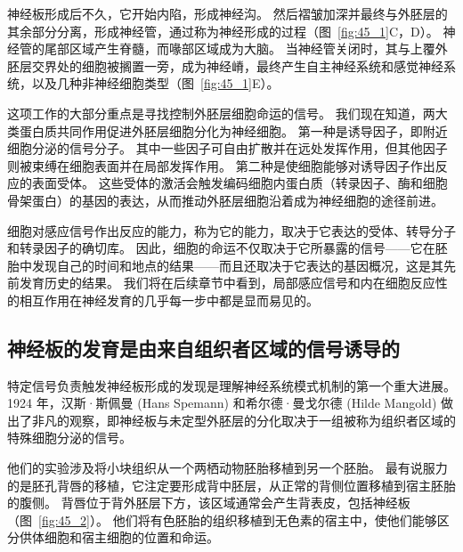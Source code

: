 神经板形成后不久，它开始内陷，形成神经沟。
然后褶皱加深并最终与外胚层的其余部分分离，形成神经管，通过称为神经形成的过程（图~\ref{fig:45_1}C，D）。
神经管的尾部区域产生脊髓，而喙部区域成为大脑。
当神经管关闭时，其与上覆外胚层交界处的细胞被搁置一旁，成为神经嵴，最终产生自主神经系统和感觉神经系统，以及几种非神经细胞类型（图~\ref{fig:45_1}E）。


这项工作的大部分重点是寻找控制外胚层细胞命运的信号。
我们现在知道，两大类蛋白质共同作用促进外胚层细胞分化为神经细胞。
第一种是诱导因子，即附近细胞分泌的信号分子。
其中一些因子可自由扩散并在远处发挥作用，但其他因子则被束缚在细胞表面并在局部发挥作用。
第二种是使细胞能够对诱导因子作出反应的表面受体。
这些受体的激活会触发编码细胞内蛋白质（转录因子、酶和细胞骨架蛋白）的基因的表达，从而推动外胚层细胞沿着成为神经细胞的途径前进。


细胞对感应信号作出反应的能力，称为它的能力，取决于它表达的受体、转导分子和转录因子的确切库。
因此，细胞的命运不仅取决于它所暴露的信号——它在胚胎中发现自己的时间和地点的结果——而且还取决于它表达的基因概况，这是其先前发育历史的结果。
我们将在后续章节中看到，局部感应信号和内在细胞反应性的相互作用在神经发育的几乎每一步中都是显而易见的。



\subsection{神经板的发育是由来自组织者区域的信号诱导的}

特定信号负责触发神经板形成的发现是理解神经系统模式机制的第一个重大进展。
1924 年，汉斯·斯佩曼 (Hans Spemann) 和希尔德·曼戈尔德 (Hilde Mangold) 做出了非凡的观察，即神经板与未定型外胚层的分化取决于一组被称为组织者区域的特殊细胞分泌的信号。


他们的实验涉及将小块组织从一个两栖动物胚胎移植到另一个胚胎。
最有说服力的是胚孔背唇的移植，它注定要形成背中胚层，从正常的背侧位置移植到宿主胚胎的腹侧。
背唇位于背外胚层下方，该区域通常会产生背表皮，包括神经板（图~\ref{fig:45_2}）。
他们将有色胚胎的组织移植到无色素的宿主中，使他们能够区分供体细胞和宿主细胞的位置和命运。


